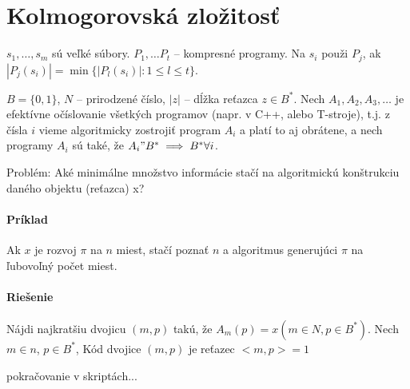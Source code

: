 \documentclass{article}
\begin{document}
\section{Kolmogorovská zložitosť}
$s_1,\ldots, s_m$ sú veľké súbory. $P_1, \ldots P_t$ -- kompresné programy. Na
$s_i$ použi $P_j$, ak $|P_j(s_i)| = \min \{ |P_l(s_i)|: 1\leq l \leq t\}$.

\par $B = \{0, 1\}$, $N$ -- prirodzené číslo, $|z|$ -- dĺžka reťazca $z \in
B^*$. Nech $A_1, A_2, A_3, \ldots$ je efektívne očíslovanie všetkých programov
(napr. v C++, alebo T-stroje), t.j. z čísla $i$ vieme algoritmicky zostrojiť
program $A_i$ a platí to aj obrátene, a nech programy $A_i$ sú také, že $A_i"
B^* \implies B^* \forall i$.

\par Problém: Aké minimálne množstvo informácie stačí na algoritmickú
konštrukciu daného objektu (reťazca) x?

\paragraph{Príklad} Ak $x$ je rozvoj $\pi$ na $n$ miest, stačí poznať $n$ a algoritmus
generujúci $\pi$ na ľubovoľný počet miest.

\paragraph{Riešenie} Nájdi najkratšiu dvojicu $(m,p)$ takú, že $A_m(p) = x (m\in
N, p \in B^*)$. Nech $m \in n$, $p \in B^*$, Kód dvojice $(m,p)$ je reťazec
$<m,p> = 1$

\par pokračovanie v skriptách...
\end{document}
